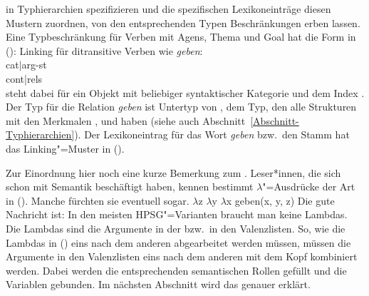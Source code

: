 in Typhierarchien spezifizieren und die spezifischen Lexikoneinträge diesen Mustern zuordnen,
\dash von den entsprechenden Typen Beschränkungen erben lassen. Eine Typbeschränkung für
Verben mit Agens, Thema und Goal hat die Form in ():
\ea
\label{bsp-linking-arg123}%
Linking für ditransitive Verben wie \emph{geben}:\\
\onems
{ cat$|$arg-st  \\[2mm]
  cont|rels  \\
}
\z
[] steht dabei für ein Objekt mit beliebiger syntaktischer Kategorie und dem Index
. 
Der Typ für die Relation \emph{geben} ist Untertyp von , dem Typ, den alle
Strukturen mit den Merkmalen \argone, \argtwo und \argthree haben (siehe auch Abschnitt~\ref{Abschnitt-Typhierarchien}). 
Der Lexikoneintrag für das Wort \emph{geben} bzw.\ den Stamm  hat das Linking"=Muster in
(). 
%

Zur Einordnung hier noch eine kurze Bemerkung zum . Leser*innen, die sich schon mit
Semantik beschäftigt haben, kennen bestimmt $\lambda$"=Ausdrücke der Art in (). Manche
fürchten sie eventuell sogar.
\ea
$\lambda$z $\lambda$y $\lambda$x geben(x, y, z)
\z
Die gute Nachricht ist: In den meisten HPSG"=Varianten braucht man keine Lambdas. Die Lambdas sind
die Argumente in der \argstl bzw.\ in den Valenzlisten. So, wie die Lambdas in () eins nach
dem anderen abgearbeitet werden müssen, müssen die Argumente in den Valenzlisten eins nach dem
anderen mit dem Kopf kombiniert werden. Dabei werden die entsprechenden semantischen Rollen gefüllt
und die Variablen gebunden. Im nächsten Abschnitt wird das genauer erklärt.

